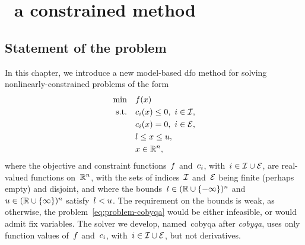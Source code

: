 %
%
%
\chapter{ \textemdash\ a constrained  method}
\label{ch:cobyqa-introduction}

\section{Statement of the problem}

In this chapter, we introduce a new model-based \gls{dfo} method for solving nonlinearly-constrained problems of the form
\begin{subequations}
    \label{eq:problem-cobyqa}
    \begin{align}
        \min        & \quad f(x) \label{eq:problem-cobyqa-obj}\\
        \text{s.t.} & \quad c_{i}(x) \le 0, ~ i \in \mathcal{I}, \label{eq:problem-cobyqa-ub}\\
                    & \quad c_{i}(x) = 0, ~ i \in \mathcal{E},\\
                    & \quad l \le x \le u, \label{eq:problem-cobyqa-bd}\\
                    & \quad x \in \mathbb{R}^n, \nonumber
    \end{align}
\end{subequations}
where the objective and constraint functions~$f$ and~$c_{i}$, with~$i \in \mathcal{I} \cup \mathcal{E}$, are real-valued functions on~$\mathbb{R}^n$, with the sets of indices~$\mathcal{I}$ and~$\mathcal{E}$ being finite (perhaps empty) and disjoint, and where the bounds~$l \in (\mathbb{R} \cup \{-\infty\})^n$ and~$u \in (\mathbb{R} \cup \{\infty\})^n$ satisfy~$l < u$.
The requirement on the bounds is weak, as otherwise, the problem~\cref{eq:problem-cobyqa} would be either infeasible, or would admit fix variables.
The solver we develop, named~\gls{cobyqa} after \emph{\glsdesc{cobyqa}}, uses only function values of~$f$ and~$c_{i}$, with~$i \in \mathcal{I} \cup \mathcal{E}$, but not derivatives.

